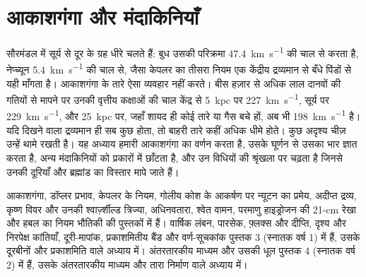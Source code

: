 \chapter{आकाशगंगा और मंदाकिनियाँ}\label{ch:b3:milky-way-galaxies}

सौरमंडल में सूर्य से दूर के ग्रह धीरे चलते हैं: बुध उसकी परिक्रमा
\qty{47.4}{km.s^{-1}} की चाल से करता है, नेप्च्यून \qty{5.4}{km.s^{-1}} की चाल से, जैसा
केपलर का तीसरा नियम एक केंद्रीय द्रव्यमान से बँधे पिंडों से यही माँगता है। आकाशगंगा के तारे
ऐसा व्यवहार नहीं करते। बीस हज़ार से अधिक लाल दानवों की गतियों से मापने पर
उनकी वृत्तीय कक्षाओं की चाल
केंद्र से \qty{5}{kpc} पर \qty{227}{km.s^{-1}}, सूर्य पर \qty{229}{km.s^{-1}},
और \qty{25}{kpc} पर, जहाँ शायद ही कोई तारे या गैस
बचे हों, अब भी \qty{198}{km.s^{-1}} है। यदि दिखने वाला द्रव्यमान ही सब कुछ होता, तो बाहरी
तारे कहीं अधिक धीमे होते। कुछ अदृश्य चीज़ उन्हें थामे रखती है। यह अध्याय
हमारी आकाशगंगा का वर्णन करता है, उसके घूर्णन से उसका भार ज्ञात करता है,
अन्य मंदाकिनियों को प्रकारों में छाँटता है, और उन विधियों की श्रृंखला पर चढ़ता है
जिनसे उनकी दूरियाँ और ब्रह्मांड का विस्तार मापे जाते हैं।

\begin{recall}
आकाशगंगा, डॉप्लर प्रभाव, केपलर के नियम, गोलीय कोश के आकर्षण पर न्यूटन का प्रमेय,
अदीप्त द्रव्य, कृष्ण विवर और उनकी श्वार्ज़्शील्ड त्रिज्या, अधिनवतारा,
श्वेत वामन, परमाणु हाइड्रोजन की 21-cm रेखा और हबल का नियम भौतिकी की पुस्तकों में हैं।
वार्षिक लंबन, पारसेक, फ़्लक्स और दीप्ति, दृश्य और निरपेक्ष कांतियाँ,
दूरी-मापांक, प्रकाशमितीय बैंड और वर्ण-सूचकांक
पुस्तक 3 (स्नातक वर्ष 1) में हैं, उसके दूरबीनों और प्रकाशमिति वाले अध्याय में।
अंतरतारकीय माध्यम और उसकी धूल
पुस्तक 4 (स्नातक वर्ष 2) में हैं, उसके
अंतरतारकीय माध्यम और तारा निर्माण वाले अध्याय में।
\end{recall}

